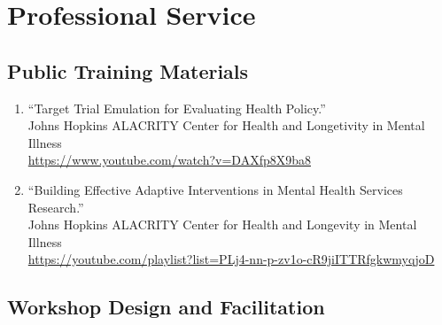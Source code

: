 \documentclass[letterpaper,11pt]{article} %
\begin{document}
	\section*{Professional Service}
	
	\subsection*{Public Training Materials}
	
	\begin{enumerate}
		\item ``Target Trial Emulation for Evaluating Health Policy.'' \\
		Johns Hopkins ALACRITY Center for Health and Longetivity in Mental Illness \\
		\url{https://www.youtube.com/watch?v=DAXfp8X9ba8}
		
		\item ``Building Effective Adaptive Interventions in Mental Health Services Research.'' \\
		Johns Hopkins ALACRITY Center for Health and Longevity in Mental Illness \\
		\url{https://youtube.com/playlist?list=PLj4-nn-p-zv1o-cR9jiITTRfgkwmyqjoD}
	\end{enumerate}
	
	\subsection*{Workshop Design and Facilitation}
	
\end{document}

